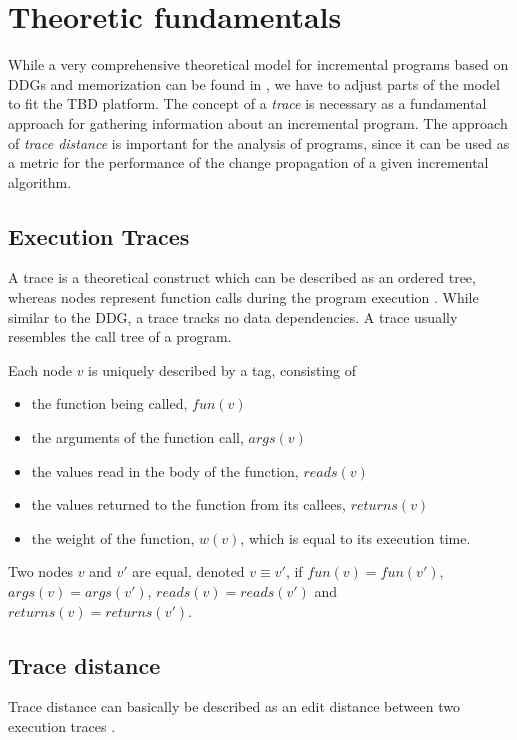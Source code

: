 \section{Theoretic fundamentals}
While a very comprehensive theoretical model for incremental programs based on DDGs and memorization can be found in \cite{Acar2005thesis}, we have to adjust parts of the model to fit the TBD platform. The concept of a \textit{trace} is necessary as a fundamental approach for gathering information about an incremental program. The approach of \textit{trace distance} is important for the analysis of programs, since it can be used as a metric for the performance of the change propagation of a given incremental algorithm. 

\subsection{Execution Traces}

\label{sec:ddg_memo}
A trace is a theoretical construct which can be described as an ordered tree, whereas nodes represent function calls during the program execution \cite{Acar2005thesis}. While similar to the DDG, a trace tracks no data dependencies. A trace usually resembles the call tree of a program. 

\begin{definition}
Each node $v$ is uniquely described by a tag, consisting of

\begin{itemize}
\item the function being called, $fun(v)$
\item the arguments of the function call, $args(v)$
\item the values read in the body of the function, $reads(v)$
\item the values returned to the function from its callees, $returns(v)$
\item the weight of the function, $w(v)$, which is equal to its execution time.
\end{itemize}

Two nodes $v$ and $v'$ are equal, denoted $v \equiv v'$, if $fun(v) = fun(v')$, $args(v) = args(v')$, $reads(v) = reads(v')$ and $returns(v) = returns(v')$.
\end{definition}

\subsection{Trace distance}
Trace distance can basically be described as an edit distance between two execution traces \cite{Acar2005thesis} \cite{acar2004dynamizing}. 

